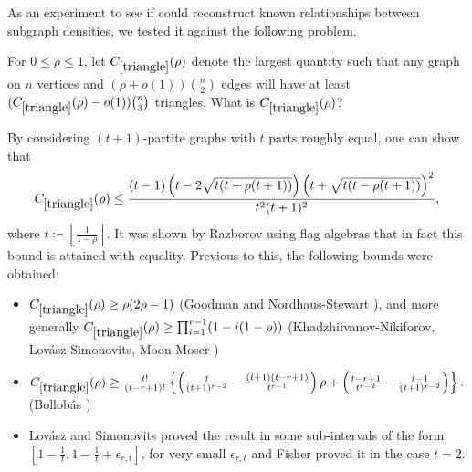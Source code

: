 As an experiment to see if \AlphaEvolve could reconstruct known relationships between subgraph densities, we tested it against the following problem.

\renewcommand{\problemURL}{https://google-deepmind.github.io/alphaevolve_repository_of_problems/problems/46.html}

\begin{problem}\label{triangle}  For $0 \leq \rho \leq 1$, let $C_{\ref{triangle}}(\rho)$ denote the largest quantity such that any graph on $n$ vertices and $(\rho+o(1)) \binom{n}{2}$ edges will have at least $(C_{\ref{triangle}}(\rho)-o(1)) \binom{n}{3}$ triangles.  What is $C_{\ref{triangle}}(\rho)$?
\end{problem}

By considering $(t+1)$-partite graphs with $t$ parts roughly equal, one can show that
\begin{equation}\label{crr}
C_{\ref{triangle}}(\rho) \leq \frac{(t - 1)\left(t - 2\sqrt{t(t - \rho(t + 1))}\right)\left(t + \sqrt{t(t - \rho(t + 1))}\right)^2}{t^2(t + 1)^2},
\end{equation}
where $t \coloneqq \left\lfloor \frac{1}{1-\rho}\right\rfloor$.  It was shown by Razborov \cite{Razborov2008} using flag algebras that in fact this bound is attained with equality.  Previous to this, the following bounds were obtained:
\begin{itemize}
\item $C_{\ref{triangle}}(\rho) \geq \rho(2\rho - 1)$ (Goodman \cite{goodman1959sets} and Nordhaus-Stewart \cite{nordhaus1963triangles}), and more generally $C_{\ref{triangle}}(\rho) \geq \prod_{i=1}^{r-1}(1 - i(1 - \rho))$ (Khadzhiivanov-Nikiforov, Lov\'asz-Simonovits, Moon-Moser \cite{khadzhiivanov1978nordhaus,lovasz1983number,moon1962problem})
\item $C_{\ref{triangle}}(\rho) \geq \frac{t!}{(t - r + 1)!} \left\{ \left( \frac{t}{(t+1)^{r-2}} - \frac{(t+1)(t-r+1)}{t^{r-1}} \right) \rho + \left( \frac{t-r+1}{t^{r-2}} - \frac{t-1}{(t+1)^{r-2}} \right) \right\}.$ (Bollob\'as \cite{bollobas1975relations})
\item 
Lov\'{a}sz and Simonovits \cite{lovasz1983number} proved the result in some sub-intervals of the form $\left[1 - \frac{1}{t}, 1 - \frac{1}{t} + \epsilon_{r,t}\right]$, for very small $\epsilon_{r,t}$ and Fisher \cite{fisher1989lower} proved it in the case $t = 2$.
\end{itemize}

